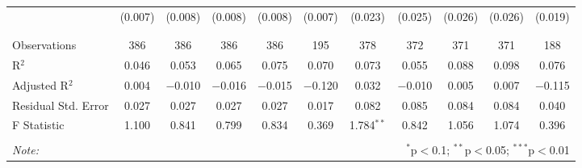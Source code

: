 \begin{table}[H]
\begin{tabular}{@{\extracolsep{4pt}}lcccccccccc}
  & (0.007) & (0.008) & (0.008) & (0.008) & (0.007) & (0.023) & (0.025) & (0.026) & (0.026) & (0.019) \\ 
  & & & & & & & & & & \\ 
\hline \\[-1.8ex] 
Observations & 386 & 386 & 386 & 386 & 195 & 378 & 372 & 371 & 371 & 188 \\ 
R$^{2}$ & 0.046 & 0.053 & 0.065 & 0.075 & 0.070 & 0.073 & 0.055 & 0.088 & 0.098 & 0.076 \\ 
Adjusted R$^{2}$ & 0.004 & $-$0.010 & $-$0.016 & $-$0.015 & $-$0.120 & 0.032 & $-$0.010 & 0.005 & 0.007 & $-$0.115 \\ 
Residual Std. Error & 0.027 & 0.027 & 0.027 & 0.027 & 0.017 & 0.082 & 0.085 & 0.084 & 0.084 & 0.040 \\ 
F Statistic & 1.100 & 0.841 & 0.799 & 0.834 & 0.369 & 1.784$^{**}$ & 0.842 & 1.056 & 1.074 & 0.396 \\ 
\hline 
\hline \\[-1.8ex] 
\textit{Note:}  & \multicolumn{10}{r}{$^{*}$p$<$0.1; $^{**}$p$<$0.05; $^{***}$p$<$0.01} \\ 
\end{tabular} 
\end{table} 
